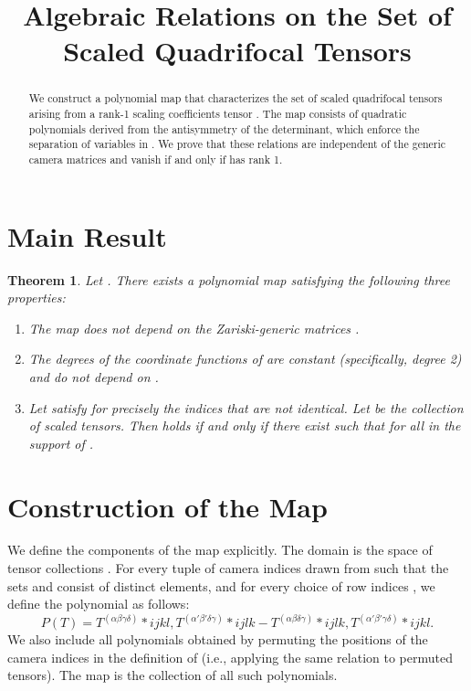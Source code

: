 \documentclass[12pt]{article}
\newtheorem{theorem}{Theorem}
\begin{document}
\title{Algebraic Relations on the Set of Scaled Quadrifocal Tensors}
\author{}
\date{}
\maketitle

\begin{abstract}
We construct a polynomial map  that characterizes the set of scaled quadrifocal tensors arising from a rank-1 scaling coefficients tensor . The map consists of quadratic polynomials derived from the antisymmetry of the determinant, which enforce the separation of variables in . We prove that these relations are independent of the generic camera matrices and vanish if and only if  has rank 1.
\end{abstract}

\section{Main Result}

\begin{theorem}
Let . There exists a polynomial map  satisfying the following three properties:
\begin{enumerate}
\item The map  does not depend on the Zariski-generic matrices .
\item The degrees of the coordinate functions of  are constant (specifically, degree 2) and do not depend on .
\item Let  satisfy  for precisely the indices that are not identical. Let  be the collection of scaled tensors. Then  holds if and only if there exist  such that  for all  in the support of .
\end{enumerate}
\end{theorem}

\section{Construction of the Map }

We define the components of the map  explicitly. The domain is the space of tensor collections .
For every tuple of camera indices  drawn from  such that the sets  and  consist of distinct elements, and for every choice of row indices , we define the polynomial  as follows:
\begin{equation} \label{eq:poly}
P(T) = T^{(\alpha \beta \gamma \delta)}*{i j k l} , T^{(\alpha' \beta' \delta \gamma)}*{i j l k} - T^{(\alpha \beta \delta \gamma)}*{i j l k} , T^{(\alpha' \beta' \gamma \delta)}*{i j k l}.
\end{equation}
We also include all polynomials obtained by permuting the positions of the camera indices in the definition of  (i.e., applying the same relation to permuted tensors). The map  is the collection of all such polynomials.
\end{document}
